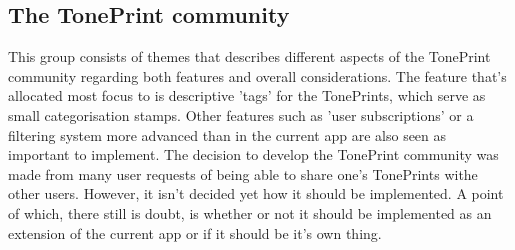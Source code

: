 \subsection*{The TonePrint community}
This group consists of themes that describes different aspects of the TonePrint community regarding both features and overall considerations. The feature that's allocated most focus to is descriptive 'tags' for the TonePrints, which serve as small categorisation stamps. Other features such as 'user subscriptions' or a filtering system more advanced than in the current app are also seen as important to implement. The decision to develop the TonePrint community was made from many user requests of being able to share one's TonePrints withe other users. However, it isn't decided yet how it should be implemented. A point of which, there still is doubt, is whether or not it should be implemented as an extension of the current app or if it should be it's own thing.


